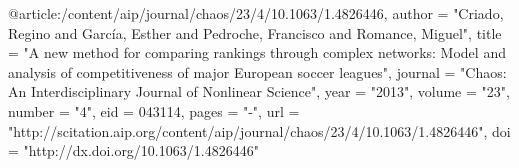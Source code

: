 @article{:/content/aip/journal/chaos/23/4/10.1063/1.4826446,
   author = "Criado, Regino and García, Esther and Pedroche, Francisco and Romance, Miguel",
   title = "A new method for comparing rankings through complex networks: Model and analysis of competitiveness of major European soccer leagues",
   journal = "Chaos: An Interdisciplinary Journal of Nonlinear Science",
   year = "2013",
   volume = "23",
   number = "4", 
   eid = 043114,
   pages = "-",
   url = "http://scitation.aip.org/content/aip/journal/chaos/23/4/10.1063/1.4826446",
   doi = "http://dx.doi.org/10.1063/1.4826446" 
}
